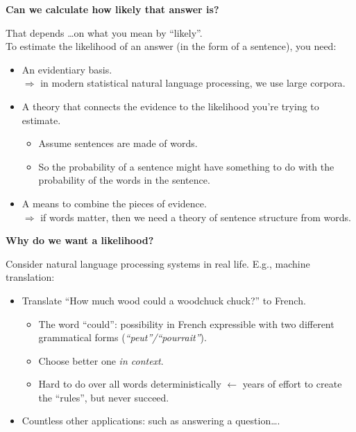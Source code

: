 \documentclass{beamer}
\newcommand{\pagestepalt}[2]{
  \begin{frame}[t]
    \begin{minipage}[t][0.26\textheight][t]{\textwidth}
      \begin{center}
        \huge
        \textbf{#1}
      \end{center}
    \end{minipage}
    
    \begin{minipage}[t][0.7\textheight][c]{\textwidth}
      #2
    \end{minipage}
  \end{frame}
}
\begin{document}
\pagestepalt{Can we calculate how \alert{likely} that answer is?}{
  \pause That depends \ldots on what you mean by ``likely''.\pause\\ To
  estimate the likelihood of an answer (in the form of a sentence),
  you need:
  \begin{itemize}
  \item An evidentiary basis.
    \\$\Rightarrow$ in modern \alert{statistical} natural language processing,
    we use large \alert{corpora}. \pause 
  \item A theory that connects the evidence to the likelihood you're
    trying to estimate.  \pause
    \begin{itemize}
    \item Assume sentences are made of words.  
    \item So the probability of a sentence might have something 
      to do with the probability of the words in the sentence.
    \end{itemize}\pause
  \item A means to combine the pieces of evidence.\\
    $\Rightarrow$ if words matter, then we need a \alert{theory} of sentence
    structure from words.
  \end{itemize}
}

\pagestepalt{Why do we want a likelihood?}{
  Consider natural language processing systems in real life. E.g., machine 
  translation:
  \begin{itemize}
  \item Translate ``How much wood \alert{could} a woodchuck chuck?'' to French.
    \begin{itemize}
    \item The word ``could'': possibility in French expressible with 
      two different grammatical forms ({\it ``peut''/``pourrait''}).
    \item Choose better one {\it in context}.
    \item Hard to do over all words deterministically $\leftarrow$
      years of effort to create the ``rules'', but never succeed.
    \end{itemize}
  \item Countless other applications: such as answering a question\ldots.
  \end{itemize}
}
\end{document}
